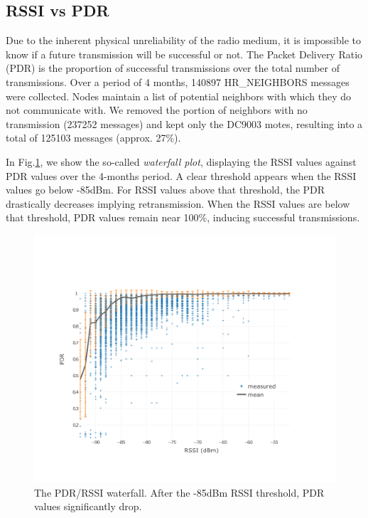 \documentclass{sig-alternate}
\begin{document}
\subsection{RSSI vs PDR}


Due to the inherent physical unreliability of the radio medium, it is impossible to know if a future transmission will be successful or not.
The Packet Delivery Ratio (PDR) is the proportion of successful transmissions over the total number of transmissions.
Over a period of 4 months, 140897 HR\_NEIGHBORS messages were collected.
Nodes maintain a list of potential neighbors with which they do not communicate with.
We removed the portion of neighbors with no transmission (237252 messages) and kept only the DC9003 motes, resulting into a total of 125103 messages (approx. 27\%).


In Fig.\ref{fig:waterfall}, we show the so-called \textit{waterfall plot}, displaying the RSSI values against PDR values over the 4-months period.
A clear threshold appears when the RSSI values go below -85dBm.
For RSSI values above that threshold, the PDR drastically decreases implying retransmission.
When the RSSI values are below that threshold, PDR values remain near 100\%, inducing successful transmissions.

\begin{figure}
    \centering
    \includegraphics[width=\columnwidth]{waterfall}
    \caption{The PDR/RSSI waterfall. After the -85dBm RSSI threshold, PDR values significantly drop.}
    \label{fig:waterfall}
\end{figure}
\end{document}

